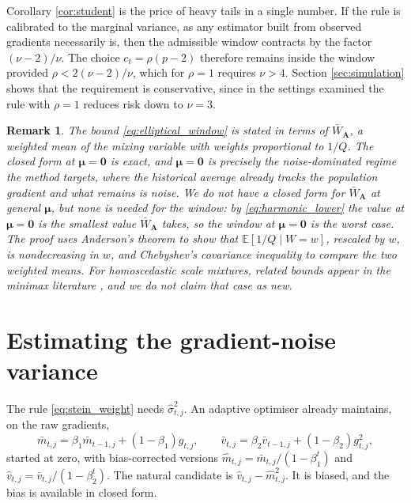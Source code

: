 \documentclass[pdflatex,sn-mathphys-num]{sn-jnl}%
\theoremstyle{thmstyleone}%
\theoremstyle{thmstyletwo}%
\newtheorem{remark}{Remark}%
\theoremstyle{thmstylethree}%
\newcommand{\rev}[1]{{\color{blue}#1}}
\newcommand{\E}{\mathbb{E}}
\begin{document}
Corollary \ref{cor:student} is the price of heavy tails in a single number. If the rule is calibrated to the marginal variance, as any estimator built from observed gradients necessarily is, then the admissible window contracts by the factor $(\nu-2)/\nu$. The choice $c_t=\rho(p-2)$ therefore remains inside the window provided $\rho<2(\nu-2)/\nu$, which for $\rho=1$ requires $\nu>4$. Section \ref{sec:simulation} shows that the requirement is conservative, since in the settings examined the rule with $\rho=1$ reduces risk down to $\nu=3$.

\begin{remark}
The bound \eqref{eq:elliptical_window} is stated in terms of $\bar W_{\bm A}$, a weighted mean of the mixing variable with weights proportional to $1/Q$. The closed form at $\bm\mu=\bm 0$ is exact, and $\bm\mu=\bm 0$ is precisely the noise-dominated regime the method targets, where the historical average already tracks the population gradient and what remains is noise. \rev{We do not have a closed form for $\bar W_{\bm A}$ at general $\bm\mu$, but none is needed for the window: by \eqref{eq:harmonic_lower} the value at $\bm\mu=\bm 0$ is the smallest value $\bar W_{\bm A}$ takes, so the window at $\bm\mu=\bm 0$ is the worst case. The proof uses Anderson's theorem \cite{anderson1955} to show that $\E[1/Q\mid W=w]$, rescaled by $w$, is nondecreasing in $w$, and Chebyshev's covariance inequality to compare the two weighted means. For homoscedastic scale mixtures, related bounds appear in the minimax literature \cite{strawderman1974, fourdrinier2018}, and we do not claim that case as new.}
\end{remark}

\section{Estimating the gradient-noise variance}
\label{sec:variance}

The rule \eqref{eq:stein_weight} needs $\hat\sigma^2_{t,j}$. An adaptive optimiser already maintains, on the raw gradients,
\begin{equation}
\label{eq:moments}
\bar m_{t,j}=\beta_1\bar m_{t-1,j}+(1-\beta_1)g_{t,j},
\qquad
\bar v_{t,j}=\beta_2\bar v_{t-1,j}+(1-\beta_2)g^2_{t,j},
\end{equation}
started at zero, with bias-corrected versions $\hat m_{t,j}=\bar m_{t,j}/(1-\beta_1^{t})$ and $\hat v_{t,j}=\bar v_{t,j}/(1-\beta_2^{t})$. The natural candidate is $\hat v_{t,j}-\hat m^2_{t,j}$. It is biased, and the bias is available in closed form.
\end{document}
